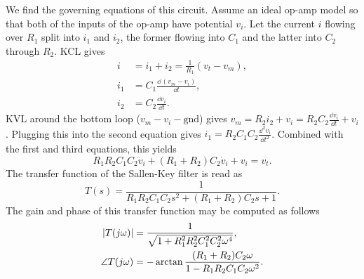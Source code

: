 We find the governing equations of this circuit. Assume an ideal op-amp model so
that both of the inputs of the op-amp have potential $v_i$. Let the current $i$
flowing over $R_{1}$ split into $i_1$ and $i_2$, the former flowing into
$C_{1}$ and the latter into $C_2$ through $R_2$. KCL gives
%
\begin{align*}
    i &= i_1 + i_2 = \frac{1}{R_{1}}(v_t - v_m), \\
    i_1 &= C_{1} \frac{\dd\, (v_m - v_i)}{\dd t}, \\
    i_2 &= C_2 \frac{\dd v_i}{\dd t}.
\end{align*}
%
KVL around the bottom loop ($v_m - v_i - \text{gnd}$) gives $v_m = R_2i_2 +
v_i = R_2C_2\frac{\dd v_i}{\dd t} + v_i$. Plugging this into the second
equation gives $i_1 = R_2C_{1}C_2\frac{\dd^2v_i}{\dd t^2}$. Combined with
the first and third equations, this yields
%
\begin{equation}
    R_{1}R_2C_{1}C_2\ddot{v}_i + (R_{1} + R_2)C_2\dot{v}_i + v_i
    = v_t.
    \label{eq:sallenkey_de}
\end{equation}
%
The transfer function of the Sallen-Key filter is read as
%
\begin{equation}
    T(s) = \frac{1}{R_{1}R_2C_{1}C_2s^2 + (R_{1}+R_2)C_2s + 1}.
    \label{eq:tf_sallenkey}
\end{equation}
%
The gain and phase of this transfer function may be computed as follows
%
\begin{align}
    \begin{split}
    \left|{T(j\omega)}\right| &= \frac{1}{\sqrt{1+R_1^2R_2^2C_1^2C_2^2\omega^4}}, \\
    \angle{T(j\omega)} &=
    -\arctan{\frac{(R_1+R_2)C_2\omega}{1-R_1R_2C_1C_2\omega^2}}.
    \end{split}
    \label{eq:sallenkey_gainphase}
\end{align}

